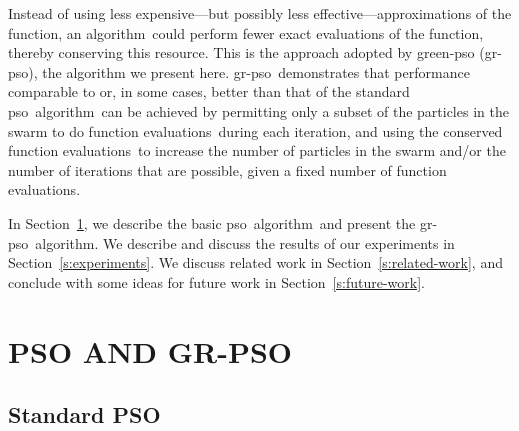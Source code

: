 \documentclass[a4paper,twoside]{article}
\newcommand{\fncevals}{function evaluations}
\newcommand{\pso}{{\sc pso}}
\newcommand{\cfe}{{\sc gr-pso}}
\newcommand{\alg}{algorithm}
\begin{document}
Instead of using less expensive---but possibly less effective---approximations of the function, an \alg\  could perform fewer exact evaluations of the function, thereby conserving this resource.  This is the approach adopted by {\sc green-pso} (\cfe), the algorithm we present here.  \cfe\ demonstrates that performance comparable to or, in some cases, better than that of the standard \pso\ \alg\ can be achieved by permitting only a subset of the particles in the swarm to do \fncevals\ during each iteration, and using the conserved \fncevals\ to increase the number of particles in the swarm and/or the number of iterations that are possible, given a fixed number of \fncevals.  

In Section~\ref{s:pso}, we describe the basic \pso\ \alg\ and present the \cfe\ \alg.  We describe and discuss the results of our experiments in Section~\ref{s:experiments}.  We discuss related work in Section~\ref{s:related-work}, and conclude with some ideas for future work in Section~\ref{s:future-work}.



\section{\uppercase{PSO and GR-PSO}}
\label{s:pso}


\subsection{Standard PSO}
\end{document}

